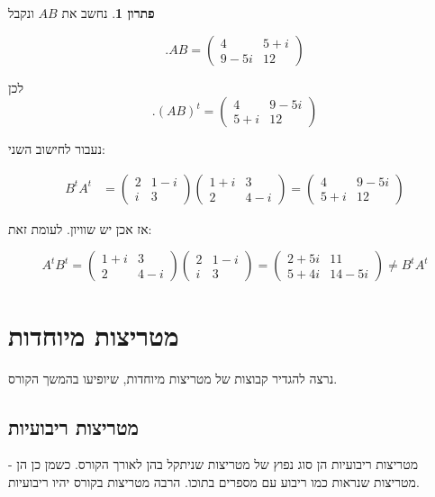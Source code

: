 \documentclass[12pt]{report}
\theoremstyle{plain}
\theoremstyle{definition}
\newtheorem*{solution}{פתרון}
\newcommand{\0}{\mathbf{0}}
\begin{document}
\begin{solution}
נחשב את
$AB$ 
ונקבל

$$
.AB=
\begin{pmatrix}
4 & 5 + i \\
9 - 5i & 12
\end{pmatrix}
$$

לכן
$$
.(AB)^t=\begin{pmatrix}
4 & 9-5i \\
5+i & 12
\end{pmatrix}
$$

נעבור לחישוב השני:

$$
\begin{aligned}
B^t A^t &=
\begin{pmatrix}
2 & 1-i \\
i & 3
\end{pmatrix}
\begin{pmatrix}
1+i & 3 \\
2 & 4-i
\end{pmatrix}
=
\begin{pmatrix}
4 & 9 - 5i \\
5 + i & 12
\end{pmatrix}
\end{aligned}
$$

אז אכן יש שוויון. לעומת זאת:

$$
A^tB^t =
\begin{pmatrix}
1+i & 3 \\
2 & 4-i
\end{pmatrix}
\begin{pmatrix}
2 & 1-i \\
i & 3
\end{pmatrix}
=
\begin{pmatrix}
2+5i & 11 \\
5 + 4i & 14-5i
\end{pmatrix}\neq B^tA^t
$$
\end{solution}

\section{מטריצות מיוחדות}

נרצה להגדיר קבוצות של מטריצות מיוחדות, שיופיעו בהמשך הקורס.

\subsection{מטריצות ריבועיות}

מטריצות ריבועיות הן סוג נפוץ של מטריצות שניתקל בהן לאורך הקורס. כשמן כן הן - מטריצות שנראות כמו ריבוע עם מספרים בתוכו. הרבה מטריצות בקורס יהיו ריבועיות.
\end{document}
